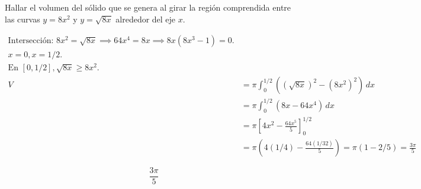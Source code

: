 Hallar el volumen del sólido que se genera al girar la región comprendida entre las curvas $y=8x^2$ y $y=\sqrt{8x}$ alrededor del eje $x$.

\nopagebreak
\begin{align*}
\text{Intersección: } 8x^2 = \sqrt{8x} \implies 64x^4 = 8x \implies 8x(8x^3-1)=0. \\
x=0, x=1/2. \\
\text{En } [0, 1/2], \sqrt{8x} \ge 8x^2. \\
V &= \pi \int_{0}^{1/2} ((\sqrt{8x})^2 - (8x^2)^2) \, dx \\
&= \pi \int_{0}^{1/2} (8x - 64x^4) \, dx \\
&= \pi \left[ 4x^2 - \frac{64x^5}{5} \right]_{0}^{1/2} \\
&= \pi \left( 4(1/4) - \frac{64(1/32)}{5} \right) = \pi (1 - 2/5) = \frac{3\pi}{5}
\end{align*}

\[
\boxed{\displaystyle \frac{3\pi}{5}}
\]
